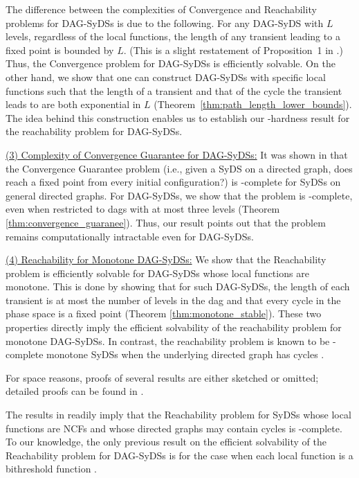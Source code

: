 \smallskip
The difference between the complexities of Convergence
and Reachability problems for DAG-SyDSs is due to the following.
For any DAG-SyDS with $L$ levels, regardless of the local functions,
the length of any transient leading to a fixed point is bounded
by $L$. (This is a slight restatement of Proposition~1 
in \cite{Chistikov-etal-2020}.)
Thus, the Convergence problem for DAG-SyDSs is efficiently solvable.
On the other hand, we show that one can construct DAG-SyDSs with specific local
functions such that the length of a transient and that of 
the cycle the transient leads to are both exponential in $L$
(Theorem~\ref{thm:path_length_lower_bounds}).
The idea behind this construction enables us 
to establish our \cpsp-hardness result for
the reachability problem for DAG-SyDSs.

\smallskip

\noindent
\underline{(3) Complexity of Convergence Guarantee for DAG-SyDSs:}
It was shown in \cite{Chistikov-etal-2020} that
the Convergence Guarantee problem 
(i.e., given a SyDS \cals{} on
a directed graph, does \cals{} reach a fixed point from every
initial configuration?)  
is \cpsp-complete for SyDSs on general directed graphs.
For DAG-SyDSs, we show that the problem is \cconp-complete,
even when restricted to dags with at most  three levels 
(Theorem \ref{thm:convergence_guaranee}).
Thus, our result points out that the problem remains 
computationally intractable even for DAG-SyDSs.

\smallskip

\noindent
\underline{(4) Reachability for Monotone DAG-SyDSs:} 
We show that the Reachability problem is efficiently solvable for
DAG-SyDSs whose local functions are monotone. 
This is done by showing that for such DAG-SyDSs, the length
of each transient is at most the number of levels in the dag and
that every cycle in the
phase space is a fixed point (Theorem \ref{thm:monotone_stable}).
These two properties directly imply
the efficient solvability of the reachability
problem for monotone DAG-SyDSs.
In contrast, the reachability problem is known to be
\cpsp-complete monotone SyDSs when the underlying
directed graph has cycles \cite{OU-2017}.

For space reasons, proofs of several results
are either sketched or omitted; detailed 
proofs can be found in \cite{Rosenkrantz-etal-2020}.

\iffalse
The results in \cite{Rosenkrantz-etal-2018} readily imply
that the Reachability problem for SyDSs whose local
functions are NCFs and whose directed graphs may contain cycles  
is \cpsp-complete.
To our knowledge, the only previous result on the efficient
solvability of the  Reachability problem for DAG-SyDSs is
for the case when each local function is a bithreshold
function \cite{KKM+2013}.

